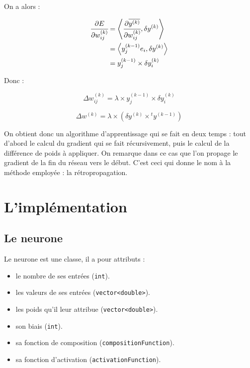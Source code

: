 On a alors :

\begin{align*}
\cfrac{\partial E}{\partial w_{ij}^{(k)}} &= \left\langle\cfrac{\partial \overline{y^{(k)}}}{\partial w_{ij}^{(k)}} ,\delta y^{(k)}\right\rangle\\
&= \left\langle y^{(k-1)}_j e_i,\delta y^{(k)}\right\rangle\\
& = y^{(k-1)}_j \times \delta y^{(k)}_i
\end{align*}

Donc :

\[\Delta w^{(k)}_{ij} = \lambda \times y^{(k-1)}_j \times \delta y^{(k)}_i\]

\[\Delta w^{(k)} = \lambda \times (\delta y^{(k)} \times {}^t \! y^{(k-1)})\]

On obtient donc un algorithme d'apprentissage qui se fait en deux temps : tout
d'abord le calcul du gradient qui se fait récursivement, puis le calcul de la
différence de poids à appliquer. On remarque dans ce cas que l'on propage le
gradient de la fin du réseau vers le début. C'est ceci qui donne le nom à la
méthode employée : la rétropropagation.

\section{L'implémentation}

\subsection{Le neurone}

Le neurone est une classe, il a pour attributs :
\begin{itemize}
  \item le nombre de ses entrées (\verb+int+).
  \item les valeurs de ses entrées (\verb+vector<double>+).
  \item les poids qu'il leur attribue (\verb+vector<double>+).
  \item son biais (\verb+int+).
  \item sa fonction de composition (\verb+compositionFunction+).
  \item sa fonction d'activation (\verb+activationFunction+).
\end{itemize}

\medskip

